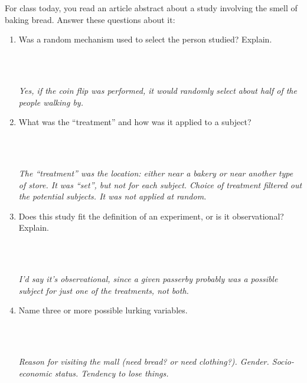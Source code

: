 For class today, you read an article abstract about a study involving
the smell of baking bread.  Answer these questions about it:


 \begin{enumerate}
   \item  Was a random mechanism used to select the person studied?
     Explain. 
\begin{students}
 \vspace{1cm}\\
\end{students}
\begin{key}
\\ {\it Yes, if the coin flip was performed, it would randomly select
  about half of the people walking by. }
\end{key}
   \item  What was the “treatment” and how was it applied to a
     subject? 
\begin{students}
 \vspace{1cm}\\
\end{students}
\begin{key}
 \\{\it The ``treatment'' was the location: either near a bakery or
   near another type of store. It was ``set'', but not for each
   subject. Choice of treatment filtered out the potential subjects.
   It was not applied at random.}
\end{key}
   \item  Does this study fit the definition of an experiment, or is
     it observational? Explain. 
\begin{students}
 \vspace{1cm}\\
\end{students}
\begin{key}
 \\ {\it I'd say it's observational, since a given passerby probably
   was a possible subject for just one of the treatments, not both.}
\end{key}
   \item  Name three or more possible lurking variables. 
\begin{students}
 \vspace{1cm}\\
\end{students}
\begin{key}
 \\ {\it Reason for visiting the mall (need bread? or need
   clothing?).  Gender. Socio-economic status. Tendency to lose things.}


\end{key}
\end{enumerate}
